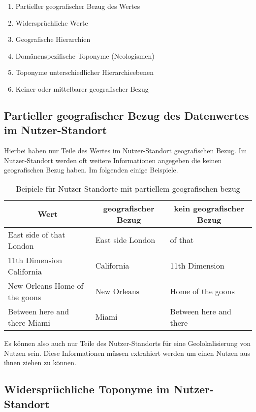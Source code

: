 		\begin{enumerate}	
		 	\item Partieller geografischer Bezug des Wertes
		 	\item Widersprüchliche Werte 
		 	\item Geografische Hierarchien
		 	\item Domänenspezifische Toponyme (Neologismen)
		 	\item Toponyme unterschiedlicher Hierarchieebenen
		 	\item Keiner oder mittelbarer geografischer Bezug
		\end{enumerate}	 

		\subsection{Partieller geografischer Bezug des Datenwertes im Nutzer-Standort} \label{sub:partiellerGeografischerBezug} 

			Hierbei haben nur Teile des Wertes im Nutzer-Standort geografischen Bezug. 
			Im Nutzer-Standort werden oft weitere Informationen angegeben die keinen geografischen Bezug haben. 
			Im folgenden einige Beispiele.

			\begin{table}[h]
				\centering
				\caption{Beipiele für Nutzer-Standorte mit partiellem geografischen bezug}
				\label{my-label}
				\begin{tabular}{|l|l|l|}
				\hline
				\multicolumn{1}{|c|}{Wert} & \multicolumn{1}{c|}{geografischer Bezug} & \multicolumn{1}{c|}{kein geografischer Bezug} \\ \hline
				East side of that London & East side London & of that \\ \hline
				11th Dimension California & California & 11th Dimension \\ \hline
				New Orleans Home of the goons & New Orleans & Home of the goons \\ \hline
				Between here and there Miami & Miami & Between here and there \\ \hline
				\end{tabular}
			\end{table}
			
			Es können also auch nur Teile des Nutzer-Standorts für eine Geolokalisierung von Nutzen sein.
			Diese Informationen müssen extrahiert werden um einen Nutzen aus ihnen ziehen zu können. 

		\subsection{Widersprüchliche Toponyme im Nutzer-Standort} \label{sub:wiederspruechlicheBezuege} 

